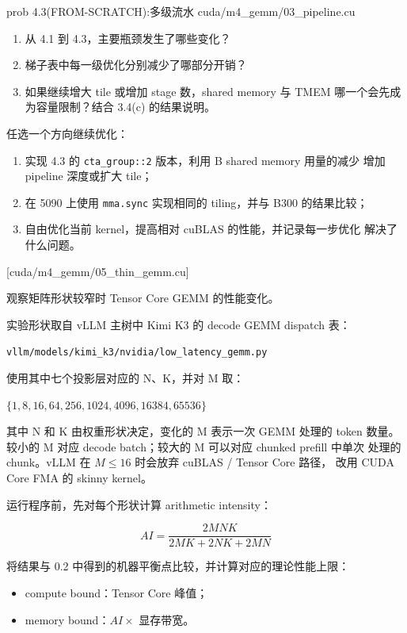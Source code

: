 \documentclass[11pt,a4paper,fontset=fandol]{ctexart}
\providecommand{\tightlist}{\setlength{\itemsep}{0pt}\setlength{\parskip}{0pt}}
\begin{document}
\begin{capstone}{prob 4.3(FROM-SCRATCH):多级流水 \hfill {\footnotesize\ttfamily cuda/m4\_gemm/03\_pipeline.cu}}
\begin{enumerate}
  \begin{enumerate}
  \def\labelenumii{(\alph{enumii})}
  \item
    从 4.1 到 4.3，主要瓶颈发生了哪些变化？
  \item
    梯子表中每一级优化分别减少了哪部分开销？
  \item
    如果继续增大 tile 或增加 stage 数，shared memory 与 TMEM
    哪一个会先成为容量限制？结合 3.4(c) 的结果说明。
  \end{enumerate}
\end{enumerate}

\end{capstone}


任选一个方向继续优化：

\begin{enumerate}
\def\labelenumi{(\alph{enumi})}
\item
  实现 4.3 的 \texttt{cta\_group::2} 版本，利用 B shared memory
  用量的减少 增加 pipeline 深度或扩大 tile；
\item
  在 5090 上使用 \texttt{mma.sync} 实现相同的 tiling，并与 B300
  的结果比较；
\item
  自由优化当前 kernel，提高相对 cuBLAS 的性能，并记录每一步优化
  解决了什么问题。
\end{enumerate}

[cuda/m4\_gemm/05\_thin\_gemm.cu]

观察矩阵形状较窄时 Tensor Core GEMM 的性能变化。

实验形状取自 vLLM 主树中 Kimi K3 的 decode GEMM dispatch 表：

\texttt{vllm/models/kimi\_k3/nvidia/low\_latency\_gemm.py}

使用其中七个投影层对应的 N、K，并对 M 取：

\(\{1, 8, 16, 64, 256, 1024, 4096, 16384, 65536\}\)

其中 N 和 K 由权重形状决定，变化的 M 表示一次 GEMM 处理的 token 数量。
较小的 M 对应 decode batch；较大的 M 可以对应 chunked prefill 中单次
处理的 chunk。vLLM 在 \(M \le 16\) 时会放弃 cuBLAS / Tensor Core 路径，
改用 CUDA Core FMA 的 skinny kernel。

运行程序前，先对每个形状计算 arithmetic intensity：

\[
AI = \frac{2MNK}{2MK + 2NK + 2MN}
\]

将结果与 0.2 中得到的机器平衡点比较，并计算对应的理论性能上限：

\begin{itemize}
\tightlist
\item
  compute bound：Tensor Core 峰值；
\item
  memory bound：\(AI \times\) 显存带宽。
\end{itemize}
\end{document}
